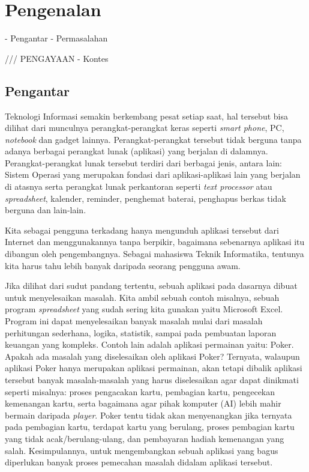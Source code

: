 \chapter{Pengenalan}\label{ch:pengantarAlgoritma}

%
- Pengantar
- Permasalahan

/// PENGAYAAN
- Kontes
%

\section{Pengantar}
Teknologi Informasi semakin berkembang pesat setiap saat, hal tersebut bisa dilihat dari munculnya perangkat-perangkat keras seperti \textit{smart phone}, PC, \textit{notebook} dan gadget lainnya. Perangkat-perangkat tersebut tidak berguna tanpa adanya berbagai perangkat lunak (aplikasi) yang berjalan di dalamnya. Perangkat-perangkat lunak tersebut terdiri dari berbagai jenis, antara lain: Sistem Operasi yang merupakan fondasi dari aplikasi-aplikasi lain yang berjalan di atasnya serta perangkat lunak perkantoran seperti \textit{text processor} atau \textit{spreadsheet}, kalender, reminder, penghemat baterai, penghapus berkas tidak berguna dan lain-lain. 
 
Kita sebagai pengguna terkadang hanya mengunduh aplikasi tersebut dari Internet dan menggunakannya tanpa berpikir, bagaimana sebenarnya aplikasi itu dibangun oleh pengembangnya. Sebagai mahasiswa Teknik Informatika, tentunya kita harus tahu lebih banyak daripada seorang pengguna awam. 

Jika dilihat dari sudut pandang tertentu, sebuah aplikasi pada dasarnya dibuat untuk menyelesaikan masalah. Kita ambil sebuah contoh misalnya, sebuah program \textit{spreadsheet} yang sudah sering kita gunakan yaitu Microsoft Excel. Program ini dapat menyelesaikan banyak masalah mulai dari masalah perhitungan sederhana, logika, statistik, sampai pada pembuatan laporan keuangan yang kompleks. Contoh lain adalah aplikasi permainan yaitu: Poker. Apakah ada masalah yang diselesaikan oleh aplikasi Poker? Ternyata, walaupun aplikasi Poker hanya merupakan aplikasi permainan, akan tetapi dibalik aplikasi tersebut banyak masalah-masalah yang harus diselesaikan agar dapat dinikmati seperti misalnya: proses pengacakan kartu, pembagian kartu, pengecekan kemenangan kartu, serta bagaimana agar pihak komputer (AI) lebih mahir bermain daripada \textit{player}. Poker tentu tidak akan menyenangkan jika ternyata pada pembagian kartu, terdapat kartu yang berulang, proses pembagian kartu yang tidak acak/berulang-ulang, dan pembayaran hadiah kemenangan yang salah. Kesimpulannya, untuk mengembangkan sebuah aplikasi yang bagus diperlukan banyak proses pemecahan masalah didalam aplikasi tersebut.

